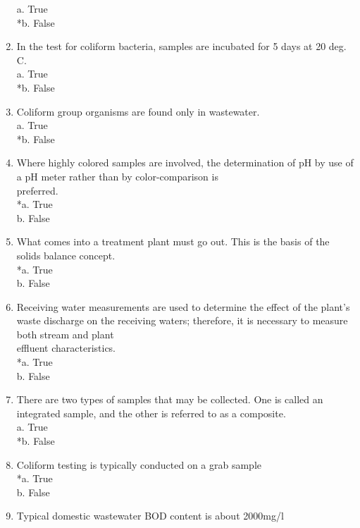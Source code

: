 \begin{enumerate}
a. True \\
*b. False 

\item  In the test for coliform bacteria, samples are incubated for 5 days at 20 deg. C. \\

a. True \\
*b. False 

\item  Coliform group organisms are found only in wastewater. \\

a. True \\
*b. False 

\item  Where highly colored samples are involved, the determination of pH by use of a pH meter rather than by color-comparison is\\
preferred. \\

*a. True \\
b. False 

\item  What comes into a treatment plant must go out. This is the basis of the solids balance concept. \\

*a. True \\
b. False 

\item  Receiving water measurements are used to determine the effect of the plant's waste discharge on the receiving waters; therefore, it is necessary to measure both stream and plant\\
effluent characteristics. \\

*a. True \\
b. False 

\item  There are two types of samples that may be collected. One is called an integrated sample, and the other is referred to as a composite. \\

a. True \\
*b. False 

\item  Coliform testing is typically conducted on a grab sample \\

*a. True \\
b. False 

\item  Typical domestic wastewater BOD content is about 2000mg/l \\


\end{enumerate}
